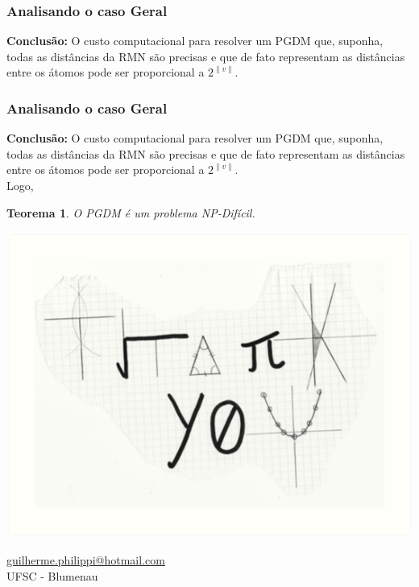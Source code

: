 \documentclass{beamer}
\newtheorem{teo}{Teorema}
\begin{document}
\begin{frame}
\frametitle{\normalsize Analisando o caso Geral}
\center\large\textbf{Conclusão:} O custo computacional para resolver um PGDM que, suponha, todas as distâncias da RMN são precisas e que de fato representam as distâncias entre os átomos pode ser proporcional a $2^{\|v\|}$.
\end{frame}

\begin{frame}
\frametitle{\normalsize Analisando o caso Geral}
\center\large\textbf{Conclusão:} O custo computacional para resolver um PGDM que, suponha, todas as distâncias da RMN são precisas e que de fato representam as distâncias entre os átomos pode ser proporcional a $2^{\|v\|}$.
\\\flushleft Logo,
\begin{teo}
O PGDM é um problema \textit{NP-Difícil}.
\end{teo}
\end{frame}

\begin{frame}
\centering
\begin{minipage}{0.3\linewidth}
	\begin{flushleft}
		\includegraphics[scale=0.35]{thank}
	\end{flushleft}
\end{minipage}
\hspace{2.5cm}
\begin{minipage}{0.4\linewidth} \centering 
	{\color{blue} \underline{guilherme.philippi@hotmail.com}} \vspace{0.2cm}  \\ UFSC - Blumenau
\end{minipage}
\end{frame}
\end{document}
